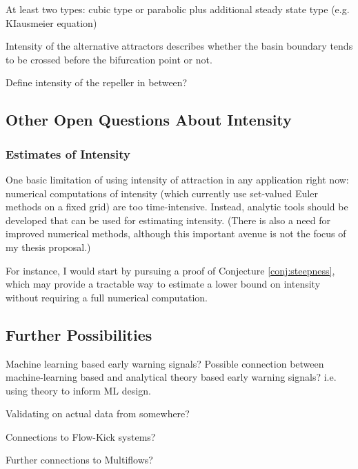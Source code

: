 At least two types: cubic type or parabolic plus additional steady state type (e.g. KIausmeier equation)

Intensity of the alternative attractors describes whether the basin boundary tends to be crossed before the bifurcation point or not. 

Define intensity of the repeller in between?

\subsection{Other Open Questions About Intensity}

\subsubsection{Estimates of Intensity}
One basic limitation of using intensity of attraction in any application right now: numerical computations of intensity (which currently use set-valued Euler methods on a fixed grid) are too time-intensive. Instead, analytic tools should be developed that can be used for estimating intensity. (There is also a need for improved numerical methods, although this important avenue is not the focus of my thesis proposal.)

For instance, I would start by pursuing a proof of Conjecture \ref{conj:steepness}, which may provide a tractable way to estimate a lower bound on intensity without requiring a full numerical computation. 

\subsubsection{}

\subsection{Further Possibilities}

Machine learning based early warning signals? Possible connection between machine-learning based and analytical theory based early warning signals? i.e. using theory to inform ML design. 

Validating on actual data from somewhere?

Connections to Flow-Kick systems?

Further connections to Multiflows?

